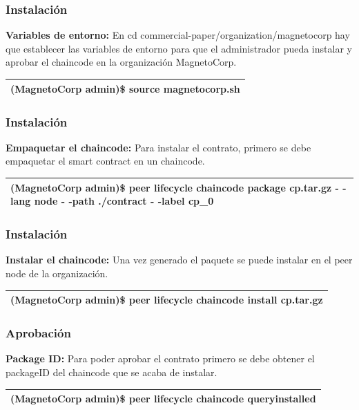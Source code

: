 \documentclass{beamer}
\begin{document}
	\begin{frame}
		\frametitle{Instalación}
		\textbf{Variables de entorno:} En cd commercial-paper/organization/magnetocorp hay que establecer las variables de entorno para que el administrador pueda instalar y aprobar el chaincode en la organización MagnetoCorp.\\
		\begin{center}
			\begin{tabulary}{\linewidth}{L}
				\hline
				(MagnetoCorp admin)\$ source magnetocorp.sh \\
				\hline
			\end{tabulary} 
		\end{center}
	\end{frame}
	
	\begin{frame}
		\frametitle{Instalación}
		\textbf{Empaquetar el chaincode:} Para instalar el contrato, primero se debe empaquetar el smart contract en un chaincode.\\
		\begin{center}
			\begin{tabulary}{\linewidth}{L}
				\hline
				(MagnetoCorp admin)\$ peer lifecycle chaincode package cp.tar.gz - -lang node - -path ./contract - -label cp\_0\\
				\hline
			\end{tabulary} 
		\end{center}
	\end{frame}
	
	\begin{frame}
		\frametitle{Instalación}
		\textbf{Instalar el chaincode:} Una vez generado el paquete se puede instalar en el peer node de la organización.\\
		\begin{center}
			\begin{tabulary}{\linewidth}{L}
				\hline
				(MagnetoCorp admin)\$ peer lifecycle chaincode install cp.tar.gz\\
				\hline
			\end{tabulary} 
		\end{center}
	\end{frame}
	
	\begin{frame}
		\frametitle{Aprobación}
		\textbf{Package ID:} Para poder aprobar el contrato primero se debe obtener el packageID del chaincode que se acaba de instalar.\\
		\begin{center}
			\begin{tabulary}{\linewidth}{L}
				\hline
				(MagnetoCorp admin)\$ peer lifecycle chaincode queryinstalled \\
				\hline
			\end{tabulary} 
		\end{center}
	\end{frame}
	
\end{document}
